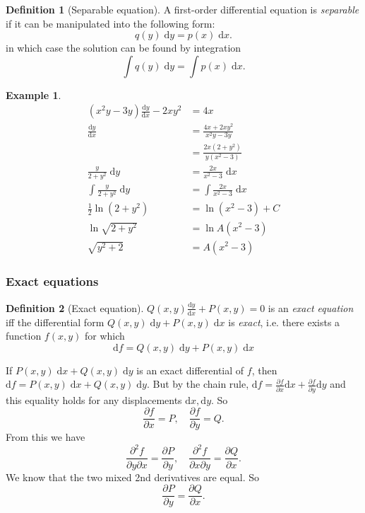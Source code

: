 \documentclass[a4paper]{article}
\theoremstyle{definition}
\newtheorem*{defi}{Definition}
\newtheorem*{eg}{Example}
\renewcommand{\d}{\mathrm{d}}
\begin{document}
\begin{defi}[Separable equation]
  A first-order differential equation is \emph{separable} if it can be manipulated into the following form:
  \[
  q(y) \;\d y = p(x) \;\d x.
  \]
  in which case the solution can be found by integration
  \[
  \int q(y)\;\d y = \int p(x)\; \d x.
  \]
\end{defi}

\begin{eg}
  \begin{align*}
    (x^2y - 3y)\frac{\d y}{\d x} - 2xy^2 &= 4x\\
    \frac{\d y}{\d x} &= \frac{4x + 2xy^2}{x^2y - 3y}\\
    &= \frac{2x(2 +  y^2)}{y(x^2 - 3)}\\
    \frac{y}{2 + y^2}\; \d y &= \frac{2x}{x^2 - 3}\;\d x\\
    \int \frac{y}{2 + y^2}\; \d y &= \int\frac{2x}{x^2 - 3}\;\d x\\
    \frac{1}{2}\ln(2 + y^2) &= \ln (x^2 - 3) + C\\
    \ln \sqrt{2 + y^2} &= \ln A(x^2 - 3)\\
    \sqrt{y^2 + 2} &= A(x^2 - 3)
  \end{align*}
\end{eg}
\subsubsection{Exact equations}
\begin{defi}[Exact equation]
  $Q(x, y)\frac{\d y}{\d x} + P(x, y) = 0$ is an \emph{exact equation} iff the differential form $Q(x, y)\;\d y + P(x, y)\;\d x$ is \emph{exact}, i.e. there exists a function $f(x, y)$ for which 
  \[
  \d f = Q(x, y)\;\d y + P(x, y)\;\d x
  \]
\end{defi}

If $P(x, y)\;\d x + Q(x, y)\;\d y$ is an exact differential of $f$, then $\d f = P(x, y) \;\d x + Q(x, y)\;\d y$. But by the chain rule, $\d f  = \frac{\partial f}{\partial x}\d x + \frac{\partial f}{\partial y}\d y$ and this equality holds for any displacements $\d x, \d y$. So
\[
\frac{\partial f}{\partial x} = P,\quad\frac{\partial f}{\partial y} = Q.
\]
From this we have
\[
\frac{\partial^2 f}{\partial y\partial x} = \frac{\partial P}{\partial y},\quad\frac{\partial^2 f}{\partial x \partial y} = \frac{\partial Q}{\partial x}.
\]
We know that the two mixed 2nd derivatives are equal. So
\[
\frac{\partial P}{\partial y} = \frac{\partial Q}{\partial x}.
\]
\end{document}

